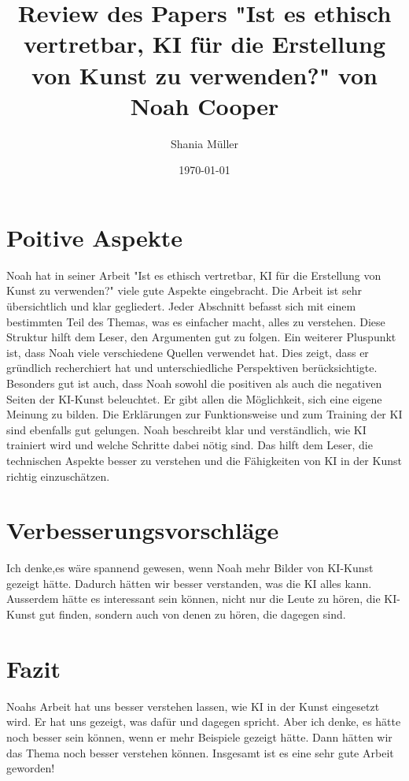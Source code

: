 \documentclass{article}
\title{Review des Papers "Ist es ethisch vertretbar, KI für die Erstellung von Kunst
zu verwenden?" von Noah Cooper}
\author{Shania Müller}
\date{\today}
\begin{document}
\maketitle



\section{Poitive Aspekte}

Noah hat in seiner Arbeit "Ist es ethisch vertretbar, KI für die Erstellung von Kunst zu verwenden?" viele gute Aspekte eingebracht.
Die Arbeit ist sehr übersichtlich und klar gegliedert. Jeder Abschnitt befasst sich mit einem bestimmten Teil des Themas, was es einfacher macht, 
alles zu verstehen. Diese Struktur hilft dem Leser, den Argumenten gut zu folgen.
Ein weiterer Pluspunkt ist, dass Noah viele verschiedene Quellen verwendet hat. Dies zeigt, dass er gründlich recherchiert hat und unterschiedliche Perspektiven berücksichtigte.
Besonders gut ist auch, dass Noah sowohl die positiven als auch die negativen Seiten der KI-Kunst beleuchtet. Er gibt allen die Möglichkeit, 
sich eine eigene Meinung zu bilden. Die Erklärungen zur Funktionsweise und zum Training der KI sind ebenfalls gut gelungen. Noah beschreibt klar und verständlich, wie KI trainiert wird 
und welche Schritte dabei nötig sind. Das hilft dem Leser, die technischen Aspekte besser zu verstehen und die Fähigkeiten von KI in der Kunst richtig einzuschätzen.

\section{Verbesserungsvorschläge}

Ich denke,es wäre spannend gewesen, wenn Noah mehr Bilder von KI-Kunst gezeigt hätte. Dadurch hätten wir besser verstanden, was die KI alles kann. 
Ausserdem hätte es interessant sein können, nicht nur die Leute zu hören, die KI-Kunst gut finden, sondern auch von denen zu hören, die dagegen sind.

\section{Fazit}

Noahs Arbeit hat uns besser verstehen lassen, wie KI in der Kunst eingesetzt wird. Er hat uns gezeigt, was dafür und dagegen spricht. Aber ich denke, 
es hätte noch besser sein können, wenn er mehr Beispiele gezeigt hätte. Dann hätten wir das Thema noch besser verstehen können.
Insgesamt ist es eine sehr gute Arbeit geworden!


\printbibliography
\end{document}
